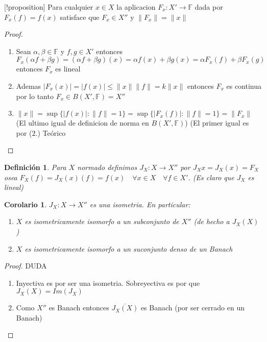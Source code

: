 \documentclass[10pt]{extarticle}
\theoremstyle{break}
\newtheorem{corollary}{Corolario}[theorem]
\newtheorem{definition}{Definición}[section]
\theoremstyle{definition}
\begin{document}
[!proposition]
Para cualquier $x\in X$ la aplicacion $F_{x}:X'\rightarrow\mathbb{F}$ dada por $F_{x}(f)=f(x)$ satisface que $F_{x}\in X''$ y $\lVert F_{x} \rVert=\lVert x \rVert$


\begin{proof}


\begin{enumerate}
\item
Sean $\alpha ,\beta\in \mathbb{F}$ y $f,g\in X'$ entonces $F_{x}(\alpha f+\beta g)=(\alpha f+\beta g)(x)=\alpha f(x)+\beta g(x)=\alpha F_{x}(f)+\beta F_{x}(g)$ entonces $F_{x}$ es lineal
\item
Ademas $\lvert F_{x}(x) \rvert=\lvert f(x) \rvert\leq \lVert x \rVert\lVert f \rVert=k\lVert x \rVert$ entonces $F_{x}$ es continua por lo tanto $F_{x}\in B(X',\mathbb{F})=X''$
\item
$\lVert x \rVert=\sup \{ \lvert f(x) \rvert:\lVert f \rVert=1 \}=\sup \{ \lvert F_{x}(f) \rvert:\lVert f \rVert=1 \}=\lVert F_{x} \rVert$ (El ultimo igual de definicion de norma en $B(X',\mathbb{F})$) (El primer igual es por ($2.$) Teórico
\end{enumerate}
\end{proof}




\begin{definition}
Para $X$ normado definimos $J_{X}:X\rightarrow X''$ por $J_{X}x=J_{X}(x)=F_{X}$ osea $F_{X}(f)=J_{X}(x)(f)=f(x)\quad\forall x\in X\quad\forall f\in X'$. (Es claro que $J_{X}$ es lineal)
\end{definition}



\begin{corollary}
$J_{X}:X\rightarrow X''$ es una isometria. En particular:
\begin{enumerate}
\item
$X$ es isometricamente isomorfo a un subconjunto de $X''$ (de hecho a $J_{X}(X)$)
\item
$X$ es isometricamente isomorfo a un suconjunto denso de un Banach
\end{enumerate}
\end{corollary}


\begin{proof} DUDA
\begin{enumerate}
\item
Inyectiva es por ser una isometria. Sobreyectiva es por que $J_{X}(X)=Im(J_{X})$
\item
Como $X''$ es Banach entonces $\overline{J_{X}(X)}$ es Banach (por ser cerrado en un Banach)
\end{enumerate}
\end{proof}
\end{document}
